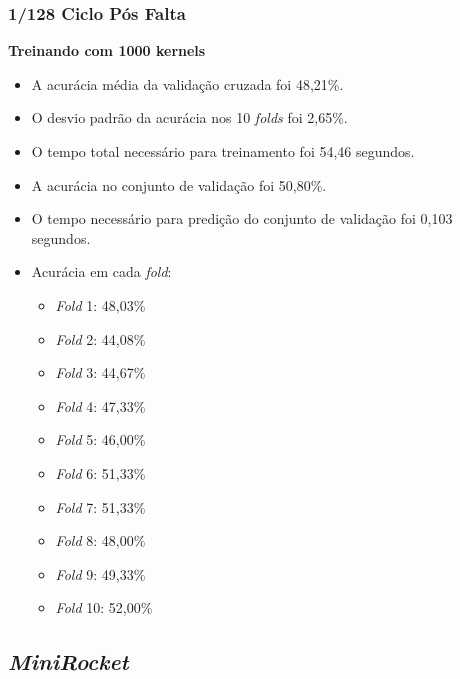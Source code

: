 \subsubsection{1/128 Ciclo Pós Falta}
\textbf{Treinando com 1000 kernels}
\begin{itemize}
    \item A acurácia média da validação cruzada foi 48,21\%.
    \item O desvio padrão da acurácia nos 10 \textit{folds} foi 2,65\%.
    \item O tempo total necessário para treinamento foi 54,46 segundos.
    \item A acurácia no conjunto de validação foi 50,80\%.
    \item O tempo necessário para predição do conjunto de validação foi 0,103 segundos.
    \item Acurácia em cada \textit{fold}:
    \begin{itemize}
        \item \textit{Fold} 1: 48,03\%
        \item \textit{Fold} 2: 44,08\%
        \item \textit{Fold} 3: 44,67\%
        \item \textit{Fold} 4: 47,33\%
        \item \textit{Fold} 5: 46,00\%
        \item \textit{Fold} 6: 51,33\%
        \item \textit{Fold} 7: 51,33\%
        \item \textit{Fold} 8: 48,00\%
        \item \textit{Fold} 9: 49,33\%
        \item \textit{Fold} 10: 52,00\%
    \end{itemize}
\end{itemize}


\subsection{\textit{MiniRocket}}
